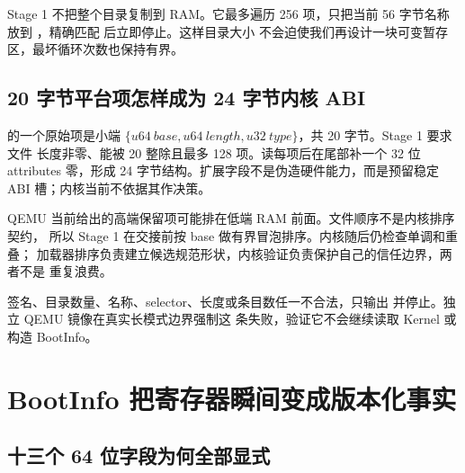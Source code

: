 Stage 1 不把整个目录复制到 RAM。它最多遍历 256 项，只把当前 56 字节名称
放到 ，精确匹配  后立即停止。这样目录大小
不会迫使我们再设计一块可变暂存区，最坏循环次数也保持有界。

\subsection{20 字节平台项怎样成为 24 字节内核 ABI}

 的一个原始项是小端
\(\{u64\ base,u64\ length,u32\ type\}\)，共 20 字节。Stage 1 要求文件
长度非零、能被 20 整除且最多 128 项。读每项后在尾部补一个 32 位
attributes 零，形成 24 字节结构。扩展字段不是伪造硬件能力，而是预留稳定
ABI 槽；内核当前不依据其作决策。

QEMU 当前给出的高端保留项可能排在低端 RAM 前面。文件顺序不是内核排序契约，
所以 Stage 1 在交接前按 base 做有界冒泡排序。内核随后仍检查单调和重叠；
加载器排序负责建立候选规范形状，内核验证负责保护自己的信任边界，两者不是
重复浪费。

签名、目录数量、名称、selector、长度或条目数任一不合法，只输出
 并停止。独立 QEMU 镜像在真实长模式边界强制这
条失败，验证它不会继续读取 Kernel 或构造 BootInfo。

\section{BootInfo 把寄存器瞬间变成版本化事实}

\subsection{十三个 64 位字段为何全部显式}

